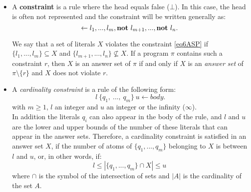 \begin{enumerate}
\begin{itemize}
\item A \textbf{constraint} is a rule where the head equals false ($\bot$).
  In this case, the head is often not represented and the constraint will be written generally as:
\begin{equation} 
  \leftarrow l_{1},...,l_{m}, \textbf{not}~ l_{m+1},..., \textbf{not}~ l_{n}.
  \label{eq6ASP}
\end{equation}

We say that a set of literals $X$ violates the constraint \eqref{eq6ASP} if $\{l_{1},...,l_{m}\} \subseteq X$ and $\{l_{m+1},...,l_{n}\} \nsubseteq X$.
If a program $\pi$ contains such a constraint $r$, then $X$ is an answer set of $\pi$ if and only if $X$ is an \textit{answer set} of $\pi \setminus \{r\}$ and $X$ does not violate $r$.

\item A \emph{cardinality constraint} is a rule of the following form:
\begin{equation} 
 ~ l ~\{q_{1},~ ... ,~ q_{m}\}~ u \leftarrow body.
 \label{eq7ASP}
\end{equation}
with $m \geq 1$, $l$ an integer and $u$ an integer or the infinity ($\infty$).   \\
In addition the literals $q_i$ can also appear in the body of the rule,
and $l$ and $u$ are the lower and upper bounds of the number of these literals
that can appear in the answer sets.
Therefore, a cardinality constraint is satisfied in an answer set $X$, if the number of atoms of $\{q_{1}, ... , q_{m}\}$ belonging to $X$ is between $l$ and $u$,
or, in other words, if:
\begin{equation}
  l \leq | \{q_{1},... , q_{m}\} \cap X | \leq u
\end{equation}
where $\cap$ is the symbol of the intersection of sets
and $|A|$ is the cardinality of the set $A$.
%
\end{itemize}

\end{enumerate}




